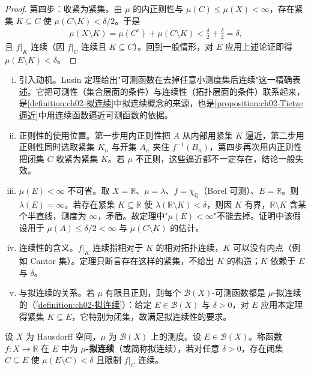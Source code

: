 \documentclass[../../main.tex]{subfiles}%
\begin{document}
\begin{proof}
第四步：收紧为紧集。由 $\mu$ 的内正则性与 $\mu(C)\leqslant\mu(X)<\infty$，存在紧集 $K\subseteq C$ 使 $\mu(C\setminus K)<\delta/2$。于是
\begin{align*}
\mu(X\setminus K)=\mu(C^c)+\mu(C\setminus K)<\frac{\delta}{2}+\frac{\delta}{2}=\delta,
\end{align*}
且 $f|_K$ 连续（因 $f|_C$ 连续且 $K\subseteq C$）。回到一般情形，对 $E$ 应用上述论证即得 $\mu(E\setminus K)<\delta$。
\end{proof}

\begin{remark}\label{remark:ch02-Lusin}
\begin{enumerate}[(i)]
\item 引入动机。Lusin 定理给出"可测函数在去掉任意小测度集后连续"这一精确表述。它把可测性（集合层面的条件）与连续性（拓扑层面的条件）联系起来，是\cref{definition:ch02-拟连续}中拟连续概念的来源，也是\cref{proposition:ch02-Tietze逼近}中用连续函数逼近可测函数的依据。
\item 正则性的使用位置。第一步用内正则性把 $A$ 从内部用紧集 $K$ 逼近，第二步用正则性同时选取紧集 $K_n$ 与开集 $A_n$ 夹住 $f^{-1}(B_n)$，第四步再次用内正则性把闭集 $C$ 收紧为紧集 $K$。若 $\mu$ 不正则，这些逼近都不一定存在，结论一般失效。
\item $\mu(E)<\infty$ 不可省。取 $X=\mathbb{R}$、$\mu=\lambda$、$f=\chi_{\mathbb{Q}}$（Borel 可测）、$E=\mathbb{R}$。则 $\lambda(E)=\infty$。若存在紧集 $K\subseteq\mathbb{R}$ 使 $\lambda(\mathbb{R}\setminus K)<\delta$，则因 $K$ 有界，$\mathbb{R}\setminus K$ 含某个半直线，测度为 $\infty$，矛盾。故定理中"$\mu(E)<\infty$"不能去掉。证明中该假设用于 $\mu(A)\leqslant\delta/2<\infty$ 与 $\mu(C\setminus K)$ 的估计。
\item 连续性的含义。$f|_K$ 连续指相对于 $K$ 的相对拓扑连续，$K$ 可以没有内点（例如 Cantor 集）。定理只断言存在这样的紧集，不给出 $K$ 的构造；$K$ 依赖于 $E$ 与 $\delta$。
\item 与拟连续的关系。若 $\mu$ 有限且正则，则每个 $\mathscr B(X)$-可测函数都是 $\mu$-拟连续的（\cref{definition:ch02-拟连续}）：给定 $E\in\mathscr B(X)$ 与 $\delta>0$，对 $E$ 应用本定理得紧集 $K\subseteq E$，它特别为闭集，故满足拟连续性的要求。
\end{enumerate}
\end{remark}

\begin{definition}\label{definition:ch02-拟连续}
设 $X$ 为 Hausdorff 空间，$\mu$ 为 $\mathscr B(X)$ 上的测度。设 $E\in\mathscr B(X)$。称函数 $f:X\to\mathbb{R}$ 在 $E$ 中为 \textbf{$\mu$-拟连续}（或简称拟连续），若对任意 $\delta>0$，存在闭集 $C\subseteq E$ 使 $\mu(E\setminus C)<\delta$ 且限制 $f|_C$ 连续。
\end{definition}
\end{document}
